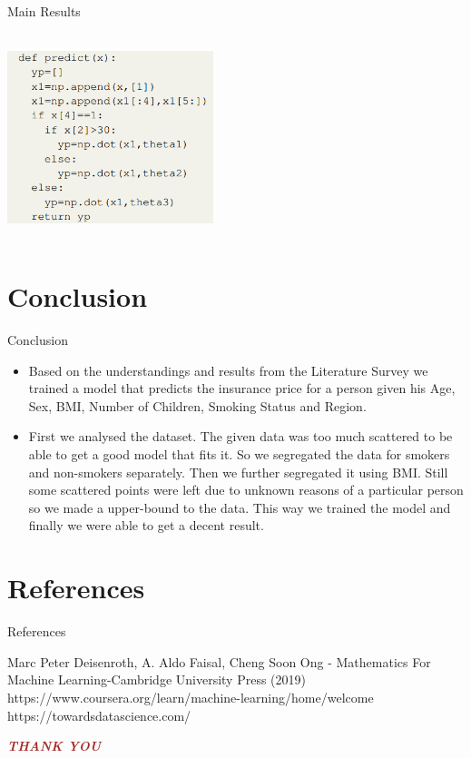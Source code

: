 \documentclass[handout,9pt]{beamer}
\numberwithin{theorem}{section}
\begin{document}
\begin{frame}{Main Results}
	\begin{spacing}{1}
		\begin{center}
			\includegraphics[height=6cm, width=6cm]{predict}
		\end{center}
	\end{spacing}
\end{frame}

\section{Conclusion}
\begin{frame}{Conclusion}
	\begin{spacing}{1}
		\begin{itemize}
			\item 	Based on the understandings and results from the Literature Survey we trained a model that predicts the insurance price for a person given his Age, Sex, BMI, Number of Children, Smoking Status and Region. \pause
			\item First we analysed the dataset. The given data was too much scattered to be able to get a good model that fits it. So we segregated the data for smokers and non-smokers separately. Then we further segregated it using BMI. Still some scattered points were left due to unknown reasons of a particular person so we made a upper-bound to the data. This way we trained the model and finally we were able to get a decent result.
		\end{itemize}
	\end{spacing}
\end{frame}

\section{References}
\begin{frame}{References}
	\begin{spacing}{1}
		\begin{thebibliography}{99}
			 Marc Peter Deisenroth, A. Aldo Faisal, Cheng Soon Ong - Mathematics For Machine Learning-Cambridge University Press (2019)
			 https://www.coursera.org/learn/machine-learning/home/welcome
			https://towardsdatascience.com/
	\end{thebibliography}
	\end{spacing}
\end{frame}

\begin{frame}
	\begin{block}{}
		\begin{center}
			\textcolor{brown}{\textbf{\em \huge  THANK YOU}}
		\end{center}
	\end{block}
\end{frame}
\end{document}
